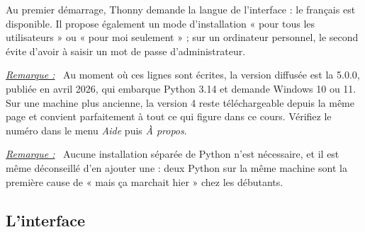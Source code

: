 \documentclass[a4paper,11pt,openany]{book}
\newenvironment{remarque}%
 {\par\vspace{1mm}\begin{list}{}{\leftmargin=1cm \rightmargin=0.5cm}\item[]%
  \textit{\underline{Remarque :}}~}%
 {\end{list}\vspace{1mm}}
\begin{document}
Au premier démarrage, Thonny demande la langue de l'interface : le français est disponible. Il propose également un mode d'installation « pour tous les utilisateurs » ou « pour moi seulement » ; sur un ordinateur personnel, le second évite d'avoir à saisir un mot de passe d'administrateur.

\begin{remarque}
Au moment où ces lignes sont écrites, la version diffusée est la 5.0.0, publiée en avril 2026, qui embarque Python 3.14 et demande Windows 10 ou 11. Sur une machine plus ancienne, la version 4 reste téléchargeable depuis la même page et convient parfaitement à tout ce qui figure dans ce cours. Vérifiez le numéro dans le menu \emph{Aide} puis \emph{À propos}.
\end{remarque}

\begin{remarque}
Aucune installation séparée de Python n'est nécessaire, et il est même déconseillé d'en ajouter une : deux Python sur la même machine sont la première cause de « mais ça marchait hier » chez les débutants.
\end{remarque}

\subsection{L'interface}
\end{document}
